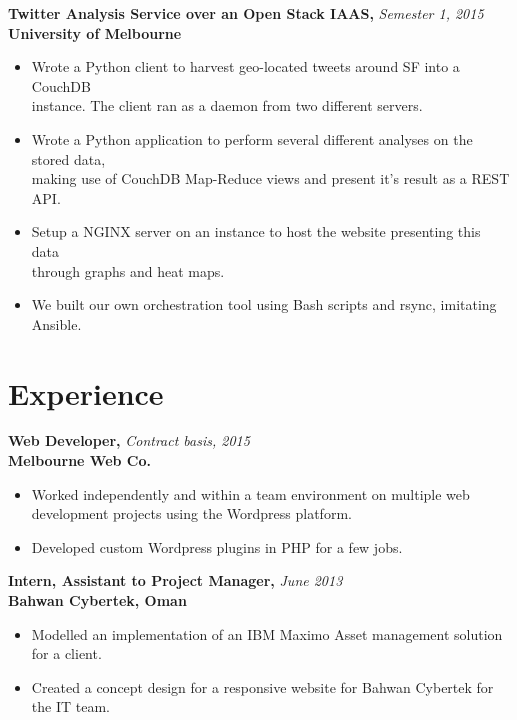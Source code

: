 \documentclass[a4paper,overlapped]{res}
\begin{document}
\begin{resume}
  \textbf{Twitter Analysis Service over an Open Stack IAAS,} 
  \hfill \textit{Semester 1, 2015}\\
  \textbf{University of Melbourne}
  \begin{itemize}
  \item Wrote a Python client to harvest geo-located tweets around SF into a
    CouchDB \\
    instance. The client ran as a daemon from two different servers.
  \item Wrote a Python application to perform several different analyses on the
    stored data, \\
    making use of CouchDB Map-Reduce views and present it's result
    as a REST API.
  \item Setup a NGINX server on an instance to host the website presenting this
    data \\ through graphs and heat maps.
  \item We built our own orchestration tool using Bash scripts and rsync,
    imitating Ansible.
    
  \end{itemize}
  

  \section{Experience}

  \textbf{Web Developer,} \hfill \textit{Contract basis, 2015}\\
  \textbf{Melbourne Web Co.}
  \begin{itemize}
  \item Worked independently and within a team environment on multiple web 
    development projects using the Wordpress platform.
  \item Developed custom Wordpress plugins in PHP for a few jobs.  
  \end{itemize}
  
  \textbf{Intern, Assistant to Project Manager,}  \hfill \textit{June 2013}\\
  \textbf{Bahwan Cybertek, Oman}
  \begin{itemize}
  \item Modelled an implementation of an IBM Maximo Asset management 
    solution for a client. 
  \item Created a concept design for a responsive website for Bahwan Cybertek 
    for the IT team. 
  \end{itemize}


\end{resume}
\end{document}
